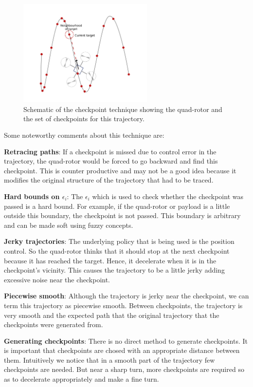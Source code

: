 \documentclass[BTech]{iitmdiss}
\begin{document}
\begin{figure}[h]
  \centering
    \includegraphics[width=0.6\textwidth]{checkpoint.png}
    \caption{Schematic of the checkpoint technique showing the quad-rotor and the set of checkpoints for this trajectory.}
\end{figure}

Some noteworthy comments about this technique are:

{\bf Retracing paths}: If a checkpoint is missed due to control error in the trajectory, the quad-rotor would be forced to go backward and find this checkpoint. This is counter productive and may not be a good idea because it modifies the original structure of the trajectory that had to be traced.

{\bf Hard bounds on $\epsilon_i$}: The $\epsilon_i$ which is used to check whether the checkpoint was passed is a hard bound. For example, if the quad-rotor or payload is a little outside this boundary, the checkpoint is not passed. This boundary is arbitrary and can be made soft using fuzzy concepts.

{\bf Jerky trajectories}: The underlying policy that is being used is the position control. So the quad-rotor thinks that it should stop at the next checkpoint because it has reached the target. Hence, it decelerate when it is in the checkpoint's vicinity. This causes the trajectory to be a little jerky adding excessive noise near the checkpoint.

{\bf Piecewise smooth}: Although the trajectory is jerky near the checkpoint, we can term this trajectory as piecewise smooth. Between checkpoints, the trajectory is very smooth and the expected path that the original trajectory that the checkpoints were generated from.

{\bf Generating checkpoints}: There is no direct method to generate checkpoints. It is important that checkpoints are chosed with an appropriate distance between them. Intuitively we notice that in a smooth part of the trajectory few checkpoints are needed. But near a sharp turn, more checkpoints are required so as to decelerate appropriately and make a fine turn.
\end{document}
